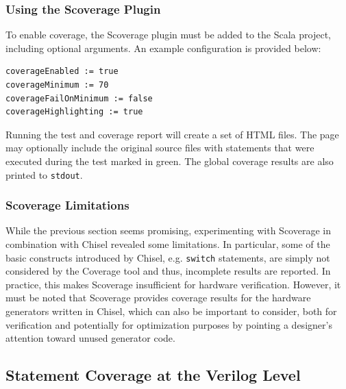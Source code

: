 \documentclass[conference]{IEEEtran}
\begin{document}
\subsubsection{Using the Scoverage Plugin}
To enable coverage, the Scoverage plugin must be added to the Scala project, including optional arguments.
An example configuration is provided below:
\begin{verbatim}
coverageEnabled := true
coverageMinimum := 70
coverageFailOnMinimum := false
coverageHighlighting := true
\end{verbatim}
Running the test and coverage report will create a set of HTML files. The page may optionally include the original source files with statements that were executed during the test marked in green. The global coverage results are also printed to \texttt{stdout}.

\subsubsection{Scoverage Limitations}
While the previous section seems promising, experimenting with Scoverage in combination with Chisel revealed some limitations. In particular, some of the basic constructs introduced by Chisel, e.g. \texttt{switch} statements, are simply not considered by the Coverage tool and thus, incomplete results are reported. In practice, this makes Scoverage insufficient for hardware verification. However, it must be noted that Scoverage provides coverage results for the hardware generators written in Chisel, which can also be important to consider, both for verification and potentially for optimization purposes by pointing a designer's attention toward unused generator code.

\subsection{Statement Coverage at the Verilog Level}
\end{document}
